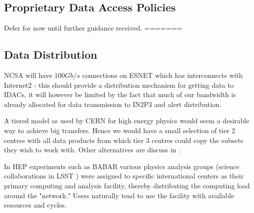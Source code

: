 \subsection{Proprietary Data Access Policies}
{\color{red}Defer for now until further guidance received.} \newline
=======

\subsection{Data Distribution} \label{sec:dist}

NCSA will have $100Gb/s$ connections  on ESNET which has interconnects with Internet2 - this should provide a distribution mechanism for getting data to IDACs, it will however be limited by the fact that much of our bandwidth is already allocated for data transmission to IN2P3 and alert distribution.

A tiered model as used by CERN for high energy physics would seem a desirable way to achieve big transfers. Hence we would have a small selection of tier 2 centres with all data products from which tier 3 centres could copy the subsets they wish to work with.  Other alternatives are discuss in .

In HEP experiments such as  BABAR various physics analysis groups (science collaborations in LSST ) were assigned to specific international centers as their primary computing and analysis facility, thereby distributing the computing load around the "network." Users naturally tend to use the facility with available resources and cycles.
~


